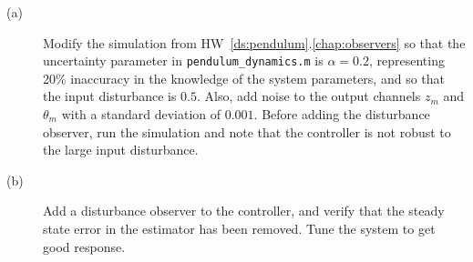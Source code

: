 \begin{description}
\item[(a)] Modify the simulation from HW~\ref{ds:pendulum}.\ref{chap:observers} so that the uncertainty parameter in {\tt  pendulum\_dynamics.m} is $\alpha=0.2$, representing 20\% inaccuracy in the knowledge of the system parameters, and so that the input disturbance is $0.5$. Also, add noise to the output channels $z_m$ and $\theta_m$ with a standard deviation of $0.001$.  Before adding the disturbance observer, run the simulation and note that the controller is not robust to the large input disturbance.
\item[(b)] Add a disturbance observer to the controller, and verify that the steady state error in the estimator has been removed.  Tune the system to get good response.
\end{description}
